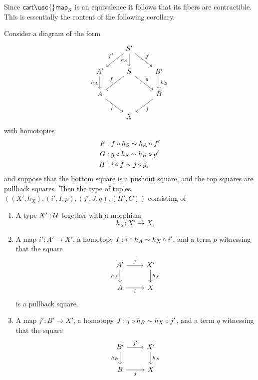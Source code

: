 Since $\mathsf{cart\usc{}map}_{\mathcal{S}}$ is an equivalence it follows that its fibers are contractible. This is essentially the content of the following corollary.

\begin{cor}
Consider a diagram of the form 
\begin{equation*}
\begin{tikzcd}
& S' \arrow[d,swap,"h_S"] \arrow[dl,swap,"{f'}"] \arrow[dr,"{g'}"] \\
A' \arrow[d,swap,"h_A"] & S \arrow[dl,swap,"f"] \arrow[dr,"g"] & B' \arrow[d,"{h_B}"] \\
A \arrow[dr,swap,"i"] & & B \arrow[dl,"j"] \\
& X
\end{tikzcd}
\end{equation*}
with homotopies
\begin{align*}
F & : f\circ h_S \sim h_A\circ f' \\
G & : g\circ h_S \sim h_B\circ g' \\
H & : i\circ f \sim j\circ g,
\end{align*}
and suppose that the bottom square is a pushout square, and the top squares are pullback squares.
Then the type of tuples $((X',h_X),(i',I,p),(j',J,q),(H',C))$ consisting of
\begin{enumerate}
\item A type $X':\mathcal{U}$ together with a morphism
\begin{equation*}
h_X : X'\to X,
\end{equation*}
\item A map $i':A'\to X'$, a homotopy $I:i\circ h_A\sim h_X\circ i'$, and a term $p$ witnessing that the square
\begin{equation*}
\begin{tikzcd}
A' \arrow[d,swap,"h_A"] \arrow[r,"{i'}"] & X' \arrow[d,"h_X"] \\
A \arrow[r,swap,"i"] & X
\end{tikzcd}
\end{equation*}
is a pullback square.
\item A map $j':B'\to X'$, a homotopy $J:j\circ h_B\sim h_X\circ j'$, and a term $q$ witnessing that the square
\begin{equation*}
\begin{tikzcd}
B' \arrow[d,swap,"h_B"] \arrow[r,"{j'}"] & X' \arrow[d,"h_X"] \\
B \arrow[r,swap,"j"] & X
\end{tikzcd}
\end{equation*}

\end{enumerate}
\end{cor}
